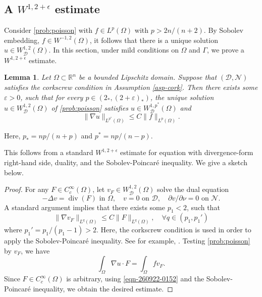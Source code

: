 \documentclass[12pt]{amsart}
\newtheorem{lemma}[theorem]{Lemma}
\numberwithin{equation}{section}
\newcommand{\bR}{\mathbb{R}}
\newcommand\cD{\mathcal{D}}
\newcommand\cN{\mathcal{N}}
\newcommand{\p}{\partial}
\newcommand{\epsi}{\varepsilon}
\begin{document}
\subsection{A $W^{1,2+\epsilon}$ estimate}
Consider \eqref{prob:poisson} with $f \in L^p(\Omega)$ with $p > 2n/(n+2)$. By Sobolev embedding, $f \in W^{-1,2}(\Omega)$, it follows that there is a unique solution $u \in W^{1,2}_\cD(\Omega)$. In this section, under mild conditions on $\Omega$ and $\Gamma$, we prove a $W^{1,2+\epsilon}$ estimate.
\begin{lemma}\label{lem-260819-1105}
Let $\Omega \subset \bR^n$ be a bounded Lipschitz domain. Suppose that $(\cD, \cN)$ satisfies the corkscrew condition in Assumption \ref{asp-cork}. Then there exists some $\epsi > 0$, such that for every $p \in (2_*, (2+\epsi)_*)$, the unique solution $u \in W^{1,2}_\cD(\Omega)$ of \eqref{prob:poisson} satisfies $u \in W^{1,p^*}_\cD(\Omega)$ and
\begin{equation*}
    \|\nabla u\|_{L^{p^*}(\Omega)} \leq C\|f\|_{L^p(\Omega)}.
\end{equation*}
\end{lemma}
Here, $p_* = np/(n+p)$ and $p^* = np/(n-p)$.

\medskip

This follows from a standard $W^{1,2+\epsilon}$ estimate for equation with divergence-form right-hand side, duality, and the Sobolev-Poincar\'e inequality. We give a sketch below.

\begin{proof}
    For any $F\in C^\infty_c(\Omega)$, let $v_F \in W^{1,2}_\cD(\Omega)$ solve the dual equation
\begin{equation*}
    -\Delta v = \operatorname{div}(F)\,\,\text{in}\,\,\Omega,
    \quad
    v=0\,\,\text{on}\,\,\cD,
    \quad
    \p v/\p \nu = 0\,\,\text{on}\,\,\cN.
\end{equation*}
A standard argument implies that there exists some $p_1<2$, such that
\begin{equation*}
    \| \nabla v_F\|_{L^q(\Omega)} \leq C \|F\|_{L^q(\Omega)},
    \quad
    \forall q \in (p_1,p_1')
\end{equation*}
where $p_1'=p_1/(p_1-1) > 2$. Here, the corkscrew condition is used in order to apply the Sobolev-Poincar\'e inequality. See for example, \cite[Lemma~3.4]{MR4261267}. Testing \eqref{prob:poisson} by $v_F$, we have
\begin{equation} \label{eqn-260922-0152}
    \int_\Omega \nabla u \cdot F
    =
    \int_\Omega f v_F.
\end{equation}
Since $F\in C^\infty_c(\Omega)$ is arbitrary, using \eqref{eqn-260922-0152} and the Sobolev-Poincar\'e inequality, we obtain the desired estimate.
\end{proof}
\end{document}
